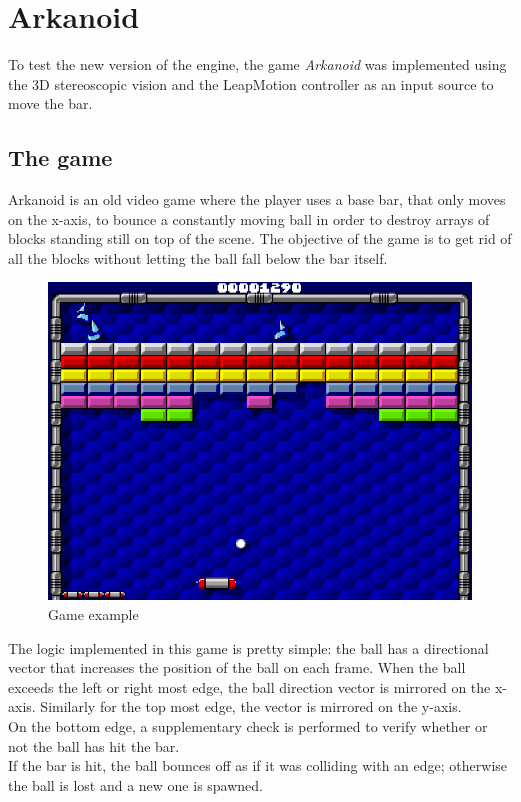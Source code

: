 \documentclass[a4paper]{report}
\begin{document}
\chapter{Arkanoid}
To test the new version of the engine, the game \emph{Arkanoid} was implemented using the 3D stereoscopic vision and the LeapMotion controller as an input source to move the bar.\\

\section{The game}
Arkanoid is an old video game where the player uses a base bar, that only moves on the x-axis, to bounce a constantly moving ball in order to destroy arrays of blocks standing still on top of the scene. The objective of the game is to get rid of all the blocks without letting the ball fall below the bar itself.\\
\begin{figure}[H]
\centering
\includegraphics[scale=0.45]{Arkanoid}
\caption{Game example}
\end{figure}

The logic implemented in this game is pretty simple: the ball has a directional vector that increases the position of the ball on each frame. When the ball exceeds the left or right most edge, the ball direction vector is mirrored on the x-axis. Similarly for the top most edge, the vector is mirrored on the y-axis.\\
On the bottom edge, a supplementary check is performed to verify whether or not the ball has hit the bar. \\
If the bar is hit, the ball bounces off as if it was colliding with an edge; otherwise the ball is lost and a new one is spawned.
\end{document}
